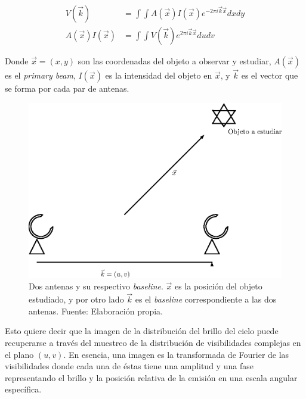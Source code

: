 \begin{align}
	V(\vec{k})           & = \int\int A(\vec{x})I(\vec{x})e^{-2\pi i\vec{k}\vec{x}}dxdy \\
	A(\vec{x})I(\vec{x}) & = \int\int V(\vec{k})e^{2\pi i\vec{k}\vec{x}}dudv
\end{align}

Donde $\vec{x} = (x,y)$ son las coordenadas del objeto a observar y estudiar, $A(\vec{x})$ es el \textit{primary beam}, $I(\vec{x})$ es la intensidad del objeto en $\vec{x}$, y $\vec{k}$ es el vector que se forma por cada par de antenas.

\begin{figure}[h!]
	\centering
	\includegraphics[scale=0.7]{images/antenas.eps}
	\caption{Dos antenas y su respectivo \textit{baseline}. $\vec{x}$ es la posición del objeto estudiado, y por otro lado $\vec{k}$ es el \textit{baseline} correspondiente a las dos antenas. Fuente: Elaboración propia.}
	\label{fig:antena}
\end{figure}

Esto quiere decir que la imagen de la distribución del brillo del cielo puede recuperarse a través del muestreo de la distribución de visibilidades complejas en el plano $(u,v)$. En esencia, una imagen es la transformada de Fourier de las visibilidades donde cada una de éstas tiene una amplitud y una fase representando el brillo y la posición relativa de la emisión en una escala angular específica.


